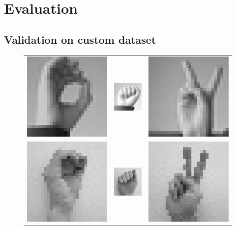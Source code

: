 \documentclass[a4paper]{article}
\begin{document}
\section{Evaluation}
\subsection{Validation on custom dataset}
\begin{figure}[t]
     \centering
     \begin{tabular}{ccc}
          \includegraphics[width=.25\linewidth]{graphics/custom_dataset/orig0}&\includegraphics[width=.25\linewidth]{graphics/custom_dataset/orig1}&\includegraphics[width=.25\linewidth]{graphics/custom_dataset/orig2} \\
          \includegraphics[width=.25\linewidth]{graphics/custom_dataset/custom0}&\includegraphics[width=.25\linewidth]{graphics/custom_dataset/custom1}&\includegraphics[width=.25\linewidth]{graphics/custom_dataset/custom2}

\end{tabular}
\end{figure}
\end{document}
